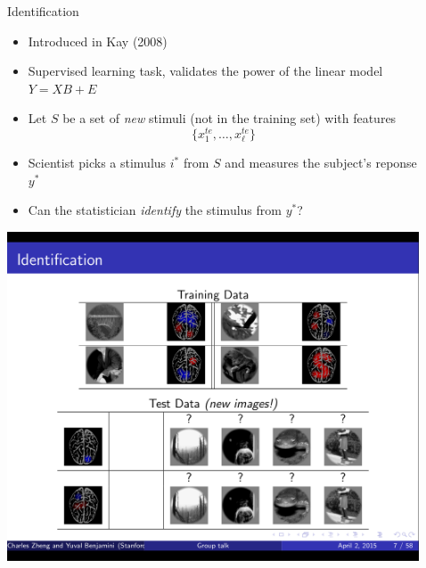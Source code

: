 \documentclass[final]{beamer}
\newlength{\sepwid}
\newlength{\onecolwid}
\begin{document}
\begin{frame}[t]
\begin{columns}[t]
\begin{column}{\onecolwid}
\begin{block}{Identification}
\begin{itemize}
\item Introduced in Kay (2008)
\item Supervised learning task, validates the power of the linear model $Y = XB + E$
\item Let $S$ be a set of \emph{new} stimuli (not in the training set) with features
\[
\{x_1^{te}, \hdots, x_\ell^{te}\}
\]
\item Scientist picks a stimulus $i^*$ from $S$ and measures the subject's reponse $y^*$
\item Can the statistician \emph{identify} the stimulus from $y^*$?
\end{itemize}
\begin{center}
\includegraphics[scale = 0.5, trim=1in 1.5in 1in 2in, clip]{screen4.png}
\end{center}
\end{block}

\end{column} %

\begin{column}{\sepwid}\end{column} %



\begin{column}{\onecolwid}



\end{column}
\end{columns}
\end{frame}
\end{document}
